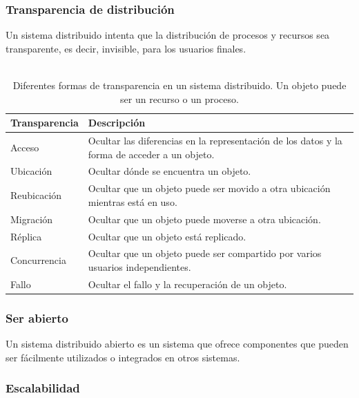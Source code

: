 \documentclass[conference,compsoc]{IEEEtran}
\begin{document}
\subsubsection{Transparencia de distribución}

Un sistema distribuido intenta que la distribución de procesos y recursos sea transparente, es decir, invisible, para los usuarios finales.

\begin{table}[!h]
    \caption{\\Diferentes formas de transparencia en un sistema distribuido. Un objeto puede ser un recurso o un proceso\cite[][Figura 1.2]{steen_tanenbaum_2017}.}
    \label{tab:transparencia}
    \begin{tabular}{|l|p{2.25in}|}
        \hline
        \textbf{Transparencia} & \textbf{Descripción} \\ \hline
        Acceso & Ocultar las diferencias en la representación de los datos y la forma de acceder a un objeto. \\ \hline
        Ubicación & Ocultar dónde se encuentra un objeto. \\ \hline
        Reubicación & Ocultar que un objeto puede ser movido a otra ubicación mientras está en uso. \\ \hline
        Migración & Ocultar que un objeto puede moverse a otra ubicación. \\ \hline
        Réplica & Ocultar que un objeto está replicado. \\ \hline
        Concurrencia & Ocultar que un objeto puede ser compartido por varios usuarios independientes. \\ \hline
        Fallo & Ocultar el fallo y la recuperación de un objeto. \\ \hline
        \end{tabular}
\end{table}

\subsubsection{Ser abierto}

Un sistema distribuido abierto es un sistema que ofrece componentes que pueden ser fácilmente utilizados o integrados en otros sistemas.

\subsubsection{Escalabilidad}
\end{document}
